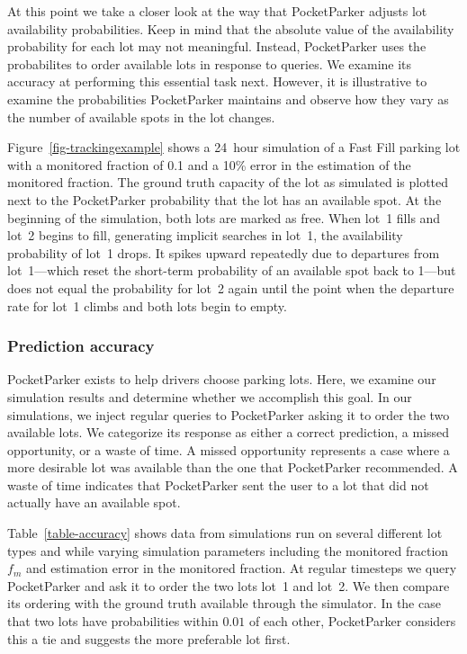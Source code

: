 At this point we take a closer look at the way that PocketParker adjusts lot
availability probabilities. Keep in mind that the absolute value of the
availability probability for each lot may not meaningful. Instead,
PocketParker uses the probabilites to order available lots in response to
queries. We examine its accuracy at performing this essential task next.
However, it is illustrative to examine the probabilities PocketParker
maintains and observe how they vary as the number of available spots in the
lot changes.

Figure~\ref{fig-trackingexample} shows a 24~hour simulation of a Fast Fill
parking lot with a monitored fraction of 0.1 and a 10\% error in the
estimation of the monitored fraction. The ground truth capacity of the lot as
simulated is plotted next to the PocketParker probability that the lot has an
available spot. At the beginning of the simulation, both lots are marked as
free. When lot~1 fills and lot~2 begins to fill, generating implicit searches
in lot~1, the availability probability of lot~1 drops. It spikes upward
repeatedly due to departures from lot~1---which reset the short-term
probability of an available spot back to 1---but does not equal the
probability for lot~2 again until the point when the departure rate for lot~1
climbs and both lots begin to empty.

\subsubsection{Prediction accuracy}



PocketParker exists to help drivers choose parking lots. Here, we examine our
simulation results and determine whether we accomplish this goal. In our
simulations, we inject regular queries to PocketParker asking it to order the
two available lots. We categorize its response as either a correct
prediction, a missed opportunity, or a waste of time. A missed opportunity
represents a case where a more desirable lot was available than the one that
PocketParker recommended. A waste of time indicates that PocketParker sent
the user to a lot that did not actually have an available spot.

Table~\ref{table-accuracy} shows data from simulations run on several
different lot types and while varying simulation parameters including the
monitored fraction $f_m$ and estimation error in the monitored fraction. At
regular timesteps we query PocketParker and ask it to order the two lots
lot~1 and lot~2. We then compare its ordering with the ground truth available
through the simulator. In the case that two lots have probabilities within
$0.01$ of each other, PocketParker considers this a tie and suggests the more
preferable lot first.

